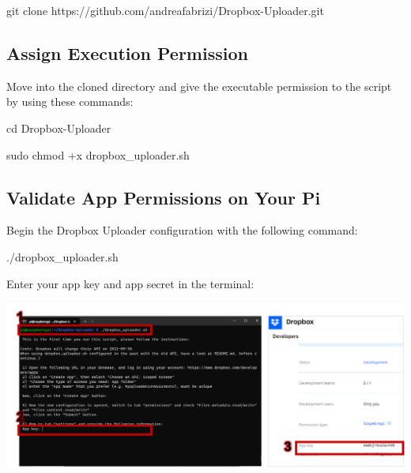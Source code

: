 \documentclass[
  letterpaper,
]{scrbook}
\newenvironment{Shaded}{\begin{snugshade}}{\end{snugshade}}
\newcommand{\BuiltInTok}[1]{\textcolor[rgb]{0.00,0.23,0.31}{#1}}
\newcommand{\ExtensionTok}[1]{\textcolor[rgb]{0.00,0.23,0.31}{#1}}
\newcommand{\FunctionTok}[1]{\textcolor[rgb]{0.28,0.35,0.67}{#1}}
\newcommand{\NormalTok}[1]{\textcolor[rgb]{0.00,0.23,0.31}{#1}}
\begin{document}
\begin{Shaded}
\begin{Highlighting}[]
\FunctionTok{git}\NormalTok{ clone https://github.com/andreafabrizi/Dropbox{-}Uploader.git}
\end{Highlighting}
\end{Shaded}

\hypertarget{assign-execution-permission}{%
\subsection{Assign Execution
Permission}\label{assign-execution-permission}}

Move into the cloned directory and give the executable permission to the
script by using these commands:

\begin{Shaded}
\begin{Highlighting}[]
\BuiltInTok{cd}\NormalTok{ Dropbox{-}Uploader}
\end{Highlighting}
\end{Shaded}

\begin{Shaded}
\begin{Highlighting}[]
\FunctionTok{sudo}\NormalTok{ chmod +x dropbox\_uploader.sh}
\end{Highlighting}
\end{Shaded}

\hypertarget{validate-app-permissions-on-your-pi}{%
\subsection{Validate App Permissions on Your
Pi}\label{validate-app-permissions-on-your-pi}}

Begin the Dropbox Uploader configuration with the following command:

\begin{Shaded}
\begin{Highlighting}[]
\ExtensionTok{./dropbox\_uploader.sh}
\end{Highlighting}
\end{Shaded}

Enter your app key and app secret in the terminal:

\includegraphics{content/material/ch2/dropbox_register1.png}
\end{document}
